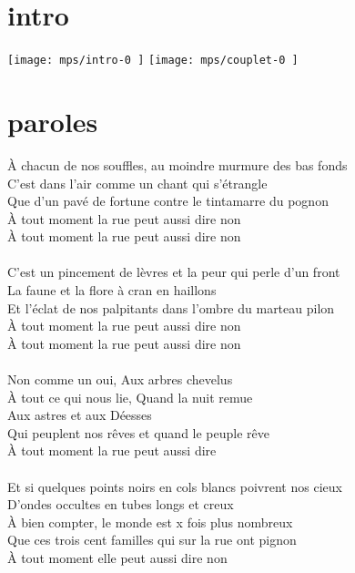 \documentclass[11pt]{article}
\begin{document}
    \makesongtitle
    \section*{intro}
    \texttt{[image:  mps/intro-0 ]}
    \texttt{[image:  mps/couplet-0 ]}

    \newpage

    \section*{paroles}
    À chacun de nos souffles, au moindre murmure des bas fonds \\
    C'est dans l'air comme un chant qui s'étrangle \\
    Que d'un pavé de fortune contre le tintamarre du pognon \\
    À tout moment la rue peut aussi dire non \\
    À tout moment la rue peut aussi dire non \\
    \\
    C'est un pincement de lèvres et la peur qui perle d'un front \\
    La faune et la flore à cran en haillons \\
    Et l'éclat de nos palpitants dans l'ombre du marteau pilon \\
    À tout moment la rue peut aussi dire non \\
    À tout moment la rue peut aussi dire non \\
    \\
    Non comme un oui, Aux arbres chevelus \\
    À tout ce qui nous lie, Quand la nuit remue \\
    Aux astres et aux Déesses \\
    Qui peuplent nos rêves et quand le peuple rêve \\
    À tout moment la rue peut aussi dire \\
    \\
    Et si quelques points noirs en cols blancs poivrent nos cieux \\
    D'ondes occultes en tubes longs et creux \\
    À bien compter, le monde est x fois plus nombreux \\
    Que ces trois cent familles qui sur la rue ont pignon \\
    À tout moment elle peut aussi dire non \\
    \\
\end{document}
